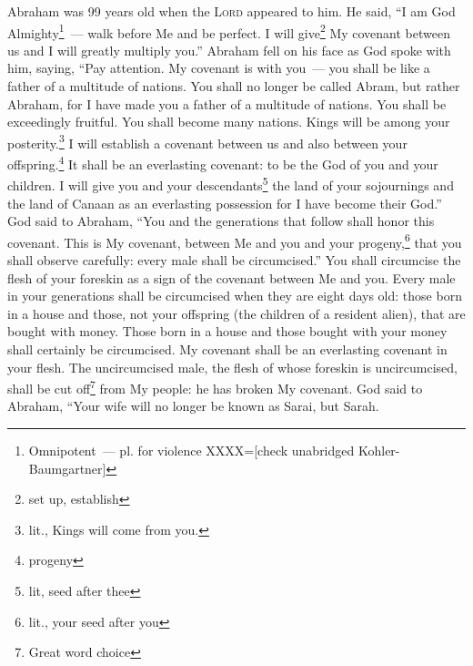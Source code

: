 \begin{enumerate}[align=center]
     Abraham was 99 years old when the \textsc{Lord} appeared to him. He said, ``I am God Almighty\footnote{Omnipotent~--- pl. for violence XXXX=[check unabridged Kohler-Baumgartner]}~--- walk before Me and be perfect.%
     I will give\footnote{set up, establish} My covenant between us and I will greatly multiply you.''%
     Abraham fell on his face as God spoke with him, saying,%
     ``Pay attention. My covenant is with you~--- you shall be like a father of a multitude of nations.%
     You shall no longer be called Abram, but rather Abraham, for I have made you a father of a multitude of nations.%
     You shall be exceedingly fruitful. You shall become many nations. Kings will be among your posterity.\footnote{lit., Kings will come from you.}%
     I will establish a covenant between us and also between your offspring.\footnote{progeny} It shall be an everlasting covenant: to be the God of you and your children.%
     I will give you and your descendants\footnote{lit, seed after thee} the land of your sojournings and the land of Canaan as an everlasting possession for I have become their God.''%
     God said to Abraham, ``You and the generations that follow shall honor this covenant.%
     This is My covenant, between Me and you and your progeny,\footnote{lit., your seed after you} that you shall observe carefully: every male shall be circumcised.''%
     You shall circumcise the flesh of your foreskin as a sign of the covenant between Me and you.%
     Every male in your generations shall be circumcised when they are eight days old: those born in a house and those, not your offspring (the children of a resident alien), that are bought with money.%
     Those born in a house and those bought with your money shall certainly be circumcised. My covenant shall be an everlasting covenant in your flesh.%
     The uncircumcised male, the flesh of whose foreskin is uncircumcised, shall be cut off\footnote{Great word choice} from My people: he has broken My covenant.%
     God said to Abraham, ``Your wife will no longer be known as Sarai, but Sarah.%

\end{enumerate}
